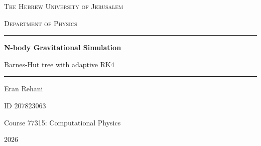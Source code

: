 \documentclass[12pt,a4paper]{article}
\newcommand{\abs}[1]{\left|#1\right|}
\begin{document}
\hypersetup{pageanchor=false}
\begin{titlepage}
    \thispagestyle{empty}
    \centering
    \vspace*{2cm}
    {\scshape\Large The Hebrew University of Jerusalem\par}
    \vspace{0.3cm}
    {\scshape\large Department of Physics\par}
    \vspace{2.5cm}
    \rule{0.62\textwidth}{0.4pt}\par
    \vspace{0.6cm}
    {\Huge\bfseries N-body Gravitational Simulation\par}
    \vspace{0.5cm}
    {\LARGE Barnes-Hut tree with adaptive RK4\par}
    \vspace{0.5cm}
    \rule{0.62\textwidth}{0.4pt}\par
    \vfill
    {\large Eran Rehani\par}
    \vspace{0.25cm}
    {\large ID 207823063\par}
    \vspace{0.4cm}
    {\large Course 77315: Computational Physics\par}
    \vspace{0.4cm}
    {\large 2026\par}
    \vspace{2cm}
\end{titlepage}

\hypersetup{pageanchor=true}

\begin{abstract}
    I simulate 5000 equal-mass particles moving under their own gravity
    for \SI{20}{Gyr}, at three starting speeds, $V=65$, $80$ and
    \SI{95}{km/s}. The forces come from a Barnes-Hut octree with the
    assigned $\theta=1$ test on the cell diagonal and the assigned
    softened force, and I step the particles forward with adaptive
    fourth-order Runge-Kutta, comparing one full step against two half
    steps.

    The assigned accuracy, $\varepsilon=0.1$ of the box size, allows a
    step error of \SI{133.2}{kpc}. That is larger than the cluster's
    starting diameter of \SI{100}{kpc}, so it barely limits the step size
    and I ran everything twice. Appendix~\ref{sec:appendixeps} gives every
    required output at $\varepsilon=0.1$, and the main text repeats the
    three runs with a tolerance $10^3$ times tighter. I quote the energy
    error as $\max_t\abs{\Delta E/E_0}$ of the escaper-corrected energy,
    which reaches $54\%$ at the assigned tolerance and stays below $0.7\%$
    at the production tolerance, so the physical conclusions come from the
    production runs.
\end{abstract}
\end{document}
